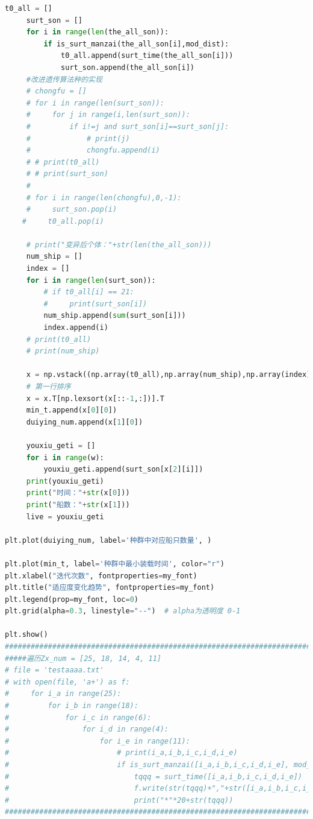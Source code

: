 \documentclass{whutmod}
\begin{document}
\begin{lstlisting}[language=python]
     t0_all = []
     surt_son = []
     for i in range(len(the_all_son)):
         if is_surt_manzai(the_all_son[i],mod_dist):
             t0_all.append(surt_time(the_all_son[i]))
             surt_son.append(the_all_son[i])
     #改进遗传算法种的实现
     # chongfu = []
     # for i in range(len(surt_son)):
     #     for j in range(i,len(surt_son)):
     #         if i!=j and surt_son[i]==surt_son[j]:
     #             # print(j)
     #             chongfu.append(i)
     # # print(t0_all)
     # # print(surt_son)
     #
     # for i in range(len(chongfu),0,-1):
     #     surt_son.pop(i)
    #     t0_all.pop(i)

     # print("变异后个体："+str(len(the_all_son)))
     num_ship = []
     index = []
     for i in range(len(surt_son)):
         # if t0_all[i] == 21:
         #     print(surt_son[i])
         num_ship.append(sum(surt_son[i]))
         index.append(i)
     # print(t0_all)
     # print(num_ship)

     x = np.vstack((np.array(t0_all),np.array(num_ship),np.array(index)))
     # 第一行排序
     x = x.T[np.lexsort(x[::-1,:])].T
     min_t.append(x[0][0])
     duiying_num.append(x[1][0])

     youxiu_geti = []
     for i in range(w):
         youxiu_geti.append(surt_son[x[2][i]])
     print(youxiu_geti)
     print("时间："+str(x[0]))
     print("船数："+str(x[1]))
     live = youxiu_geti

plt.plot(duiying_num, label='种群中对应船只数量', )

plt.plot(min_t, label='种群中最小装载时间', color="r")
plt.xlabel("迭代次数", fontproperties=my_font)
plt.title("适应度变化趋势", fontproperties=my_font)
plt.legend(prop=my_font, loc=0)
plt.grid(alpha=0.3, linestyle="--")  # alpha为透明度 0-1

plt.show()
#############################################################################################################################
#####遍历Zx_num = [25, 18, 14, 4, 11]
# file = 'testaaaa.txt'
# with open(file, 'a+') as f:
#     for i_a in range(25):
#         for i_b in range(18):
#             for i_c in range(6):
#                 for i_d in range(4):
#                     for i_e in range(11):
#                         # print(i_a,i_b,i_c,i_d,i_e)
#                         if is_surt_manzai([i_a,i_b,i_c,i_d,i_e], mod_dist):
#                             tqqq = surt_time([i_a,i_b,i_c,i_d,i_e])
#                             f.write(str(tqqq)+","+str([i_a,i_b,i_c,i_d,i_e])+","+str(sum([i_a,i_b,i_c,i_d,i_e]))+"\n")
#                             print("*"*20+str(tqqq))
############################################################################################################################


\end{lstlisting}
\end{document}
